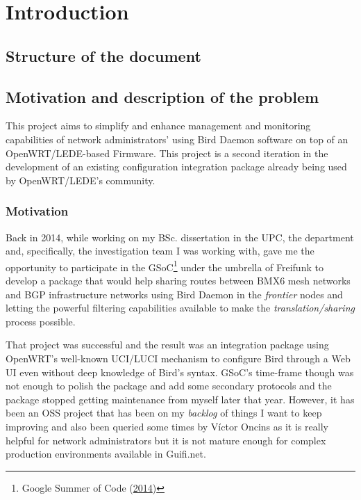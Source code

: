 \chapter{Introduction}
\label{ch:introduction}
\pagestyle{headings}


\cite{nitos}

\section{Structure of the document}



\section{Motivation and description of the problem}
\label{sec:bdotp}
This project aims to simplify and enhance management and monitoring capabilities of network administrators' using Bird Daemon software on top of an OpenWRT/LEDE-based Firmware. This project is a second iteration in the development of an existing configuration integration package already being used by OpenWRT/LEDE's community.

\subsection{Motivation}
Back in 2014, while working on my BSc. dissertation in the UPC, the department and, specifically, the investigation team I was working with, gave me the opportunity to participate in the GSoC\footnote{Google Summer of Code (\href{https://www.google-melange.com/archive/gsoc/2014/orgs/freifunk/projects/eloicaso.html}{2014})} under the umbrella of Freifunk to develop a package that would help sharing routes between BMX6 mesh networks and BGP infrastructure networks using Bird Daemon in the \textit{frontier} nodes and letting the powerful filtering capabilities available to make the \textit{translation/sharing} process possible.

That project was successful and the result was an integration package using OpenWRT's well-known UCI/LUCI mechanism to configure Bird through a Web UI even without deep knowledge of Bird's syntax. GSoC's time-frame though was not enough to polish the package and add some secondary protocols and the package stopped getting maintenance from myself later that year. However, it has been an OSS project that has been on my \textit{backlog} of things I want to keep improving and also been queried some times by Víctor Oncins as it is really helpful for network administrators but it is not mature enough for complex production environments available in Guifi.net.

